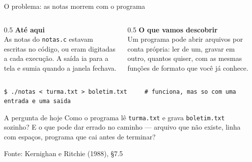 \documentclass[aspectratio=169]{beamer}
\newcommand{\fonte}[1]{\vfill\hfill{\scriptsize\textcolor{UFSGray}{Fonte: #1}}}
\begin{document}
\begin{frame}[fragile]{O problema: as notas morrem com o programa}
  \vspace{-0.4em}
  \begin{columns}[T]
    \begin{column}{0.5\textwidth}
      \textbf{Até aqui}\\[0.3em]
      \small
      As notas do \texttt{notas.c} estavam escritas no código, ou eram
      digitadas a cada execução. A saída ia para a tela e sumia quando a
      janela fechava.
    \end{column}
    \begin{column}{0.5\textwidth}
      \textbf{O que vamos descobrir}\\[0.3em]
      \small
      Um programa pode abrir arquivos por conta própria: ler de um, gravar
      em outro, quantos quiser, com as mesmas funções de formato que você
      já conhece.
    \end{column}
  \end{columns}
  \smallskip
\begin{lstlisting}[style=shellStyle]
$ ./notas < turma.txt > boletim.txt     # funciona, mas so com uma entrada e uma saida
\end{lstlisting}
  \begin{block}{A pergunta de hoje}
    Como o programa lê \texttt{turma.txt} e grava \texttt{boletim.txt}
    sozinho? E o que pode dar errado no caminho --- arquivo que não existe,
    linha com espaços, programa que cai antes de terminar?
  \end{block}
  \fonte{Kernighan e Ritchie (1988), §7.5~\cite{kernighan1988c}}
\end{frame}
\end{document}
